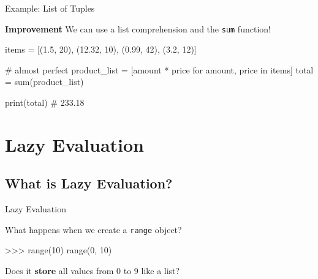 \begin{frame}[fragile]{Example: List of Tuples}

    \begin{alertblock}{{\bf Improvement}}
        We can use a list comprehension and the {\tt sum} function!
    \end{alertblock}

    \begin{pythoncode}
items = [(1.5, 20), (12.32, 10), (0.99, 42), (3.2, 12)]

# almost perfect
product_list = [amount * price for amount, price in items]
total = sum(product_list)

print(total)    # 233.18
    \end{pythoncode}


\end{frame}

\section{Lazy Evaluation}

\begin{frame}
    \sectionpage
\end{frame}

\subsection{What is Lazy Evaluation?}


\begin{frame}[fragile]{Lazy Evaluation}

    What happens when we create a {\tt range} object?

    \vspace{1em}

    \begin{outputcode}
    >>> range(10)
    range(0, 10)
    \end{outputcode}

    \vspace{1em}

    Does it {\bf store} all values from 0 to 9 like a list?


\end{frame}

